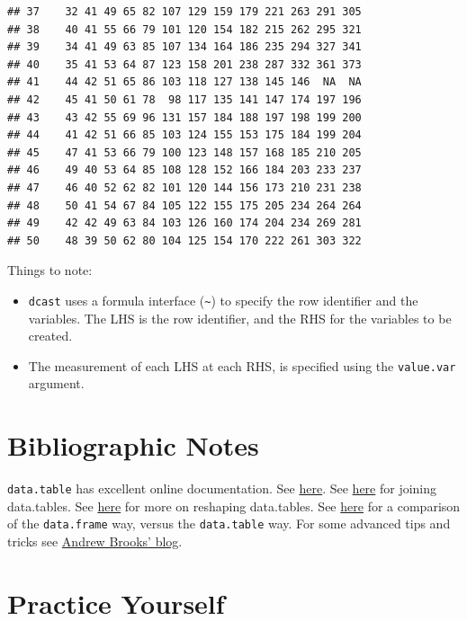 \documentclass[]{book}
\providecommand{\tightlist}{%
  \setlength{\itemsep}{0pt}\setlength{\parskip}{0pt}}
\theoremstyle{definition}
\theoremstyle{definition}
\theoremstyle{definition}
\theoremstyle{remark}
\begin{document}
\begin{verbatim}
## 37    32 41 49 65 82 107 129 159 179 221 263 291 305
## 38    40 41 55 66 79 101 120 154 182 215 262 295 321
## 39    34 41 49 63 85 107 134 164 186 235 294 327 341
## 40    35 41 53 64 87 123 158 201 238 287 332 361 373
## 41    44 42 51 65 86 103 118 127 138 145 146  NA  NA
## 42    45 41 50 61 78  98 117 135 141 147 174 197 196
## 43    43 42 55 69 96 131 157 184 188 197 198 199 200
## 44    41 42 51 66 85 103 124 155 153 175 184 199 204
## 45    47 41 53 66 79 100 123 148 157 168 185 210 205
## 46    49 40 53 64 85 108 128 152 166 184 203 233 237
## 47    46 40 52 62 82 101 120 144 156 173 210 231 238
## 48    50 41 54 67 84 105 122 155 175 205 234 264 264
## 49    42 42 49 63 84 103 126 160 174 204 234 269 281
## 50    48 39 50 62 80 104 125 154 170 222 261 303 322
\end{verbatim}

Things to note:

\begin{itemize}
\tightlist
\item
  \texttt{dcast} uses a formula interface (\texttt{\textasciitilde{}})
  to specify the row identifier and the variables. The LHS is the row
  identifier, and the RHS for the variables to be created.
\item
  The measurement of each LHS at each RHS, is specified using the
  \texttt{value.var} argument.
\end{itemize}

\section{Bibliographic Notes}\label{bibliographic-notes-17}

\texttt{data.table} has excellent online documentation. See
\href{https://cran.r-project.org/web/packages/data.table/vignettes/datatable-intro.html}{here}.
See
\href{https://rstudio-pubs-static.s3.amazonaws.com/52230_5ae0d25125b544caab32f75f0360e775.html}{here}
for joining data.tables. See
\href{https://cran.r-project.org/web/packages/data.table/vignettes/datatable-reshape.html}{here}
for more on reshaping data.tables. See
\href{https://www.r-bloggers.com/intro-to-the-data-table-package/}{here}
for a comparison of the \texttt{data.frame} way, versus the
\texttt{data.table} way. For some advanced tips and tricks see
\href{http://brooksandrew.github.io/simpleblog/articles/advanced-data-table/}{Andrew
Brooks' blog}.

\section{Practice Yourself}\label{practice-yourself-18}
\end{document}
